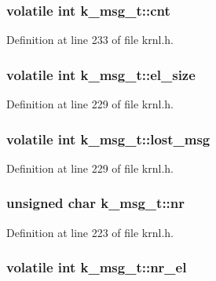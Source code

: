 \subsubsection[{cnt}]{\setlength{\rightskip}{0pt plus 5cm}volatile int k\+\_\+msg\+\_\+t\+::cnt}\label{structk__msg__t_afffaeebfdb8d84f296755babf6f296a6}


Definition at line 233 of file krnl.\+h.

\hypertarget{structk__msg__t_a9e6cf0aaaa54e2c69938457b2a16e512}{}
\subsubsection[{el\+\_\+size}]{\setlength{\rightskip}{0pt plus 5cm}volatile int k\+\_\+msg\+\_\+t\+::el\+\_\+size}\label{structk__msg__t_a9e6cf0aaaa54e2c69938457b2a16e512}


Definition at line 229 of file krnl.\+h.

\hypertarget{structk__msg__t_aea9315f70a4c165cf9bfaef79046c184}{}
\subsubsection[{lost\+\_\+msg}]{\setlength{\rightskip}{0pt plus 5cm}volatile int k\+\_\+msg\+\_\+t\+::lost\+\_\+msg}\label{structk__msg__t_aea9315f70a4c165cf9bfaef79046c184}


Definition at line 229 of file krnl.\+h.

\hypertarget{structk__msg__t_a77ce5d05e251d771c3bbdc4ca724cbf7}{}
\subsubsection[{nr}]{\setlength{\rightskip}{0pt plus 5cm}unsigned char k\+\_\+msg\+\_\+t\+::nr}\label{structk__msg__t_a77ce5d05e251d771c3bbdc4ca724cbf7}


Definition at line 223 of file krnl.\+h.

\hypertarget{structk__msg__t_ae28a828860fdf0afcd9106045d223767}{}
\subsubsection[{nr\+\_\+el}]{\setlength{\rightskip}{0pt plus 5cm}volatile int k\+\_\+msg\+\_\+t\+::nr\+\_\+el}\label{structk__msg__t_ae28a828860fdf0afcd9106045d223767}


